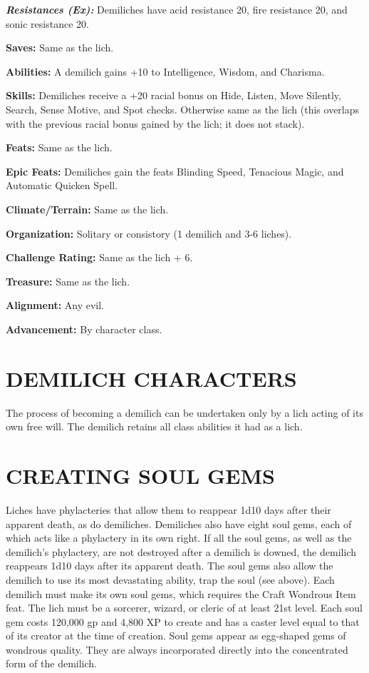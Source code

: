 \documentclass{article}
\begin{document}
\textit{\textbf{Resistances (Ex):}}\textit{ }Demiliches have acid resistance 20, 
fire resistance 20, and sonic resistance 20. 

\textbf{Saves:} Same as the lich. 

\textbf{Abilities:} A demilich gains +10 to Intelligence, Wisdom, and Charisma. 

\textbf{Skills:} Demiliches receive a +20 racial bonus on Hide, Listen, Move Silently, 
Search, Sense Motive, and Spot checks. Otherwise same as the lich (this overlaps 
with the previous racial bonus gained by the lich; it does not stack). 

\textbf{Feats:} Same as the lich. 

\textbf{Epic Feats:} Demiliches gain the feats Blinding Speed, Tenacious Magic, 
and Automatic Quicken Spell. 

\textbf{Climate/Terrain:} Same as the lich. 

\textbf{Organization:} Solitary or consistory (1 demilich and 3-6 liches). 

\textbf{Challenge Rating:} Same as the lich + 6. 

\textbf{Treasure:} Same as the lich. 

\textbf{Alignment:} Any evil. 

\textbf{Advancement:} By character class. 

\vspace{12pt}
\section*{DEMILICH CHARACTERS }

The process of becoming a demilich can be undertaken only by a lich acting of its 
own free will. The demilich retains all class abilities it had as a lich. 

\vspace{12pt}
\section*{CREATING SOUL GEMS }

Liches have phylacteries that allow them to reappear 1d10 days after their apparent 
death, as do demiliches. Demiliches also have eight soul gems, each of which acts 
like a phylactery in its own right. If all the soul gems, as well as the demilich's 
phylactery, are not destroyed after a demilich is downed, the demilich reappears 
1d10 days after its apparent death. The soul gems also allow the demilich to use 
its most devastating ability, trap the soul (see above). Each demilich must make 
its own soul gems, which requires the Craft Wondrous Item feat. The lich must be 
a sorcerer, wizard, or cleric of at least 21st level. Each soul gem costs 120,000 
gp and 4,800 XP to create and has a caster level equal to that of its creator at 
the time of creation. Soul gems appear as egg-shaped gems of wondrous quality. 
They are always incorporated directly into the concentrated form of the demilich. 
\end{document}
